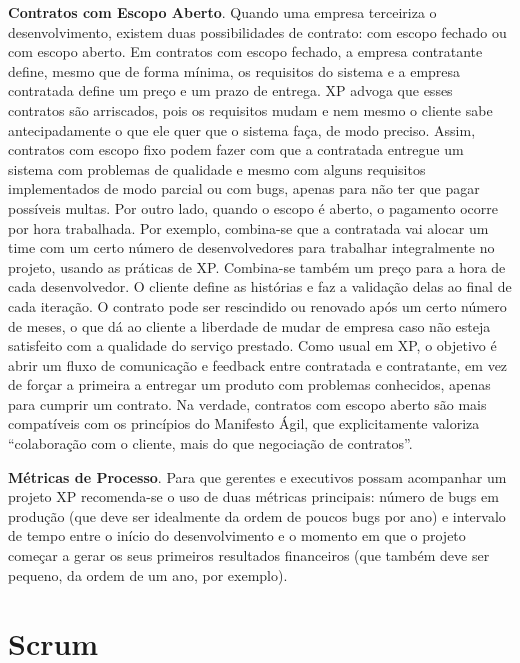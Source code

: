 \documentclass[
  11pt,
  twoside]{book}
\begin{document}
\textbf{Contratos com Escopo Aberto}. Quando uma empresa terceiriza o
desenvolvimento, existem duas possibilidades de contrato: com escopo
fechado ou com escopo aberto. Em contratos com escopo fechado, a empresa
contratante define, mesmo que de forma mínima, os requisitos do sistema
e a empresa contratada define um preço e um prazo de entrega. XP advoga
que esses contratos são arriscados, pois os requisitos mudam e nem mesmo
o cliente sabe antecipadamente o que ele quer que o sistema faça, de
modo preciso. Assim, contratos com escopo fixo podem fazer com que a
contratada entregue um sistema com problemas de qualidade e mesmo com
alguns requisitos implementados de modo parcial ou com bugs, apenas para
não ter que pagar possíveis multas. Por outro lado, quando o escopo é
aberto, o pagamento ocorre por hora trabalhada. Por exemplo, combina-se
que a contratada vai alocar um time com um certo número de
desenvolvedores para trabalhar integralmente no projeto, usando as
práticas de XP. Combina-se também um preço para a hora de cada
desenvolvedor. O cliente define as histórias e faz a validação delas ao
final de cada iteração. O contrato pode ser rescindido ou renovado após
um certo número de meses, o que dá ao cliente a liberdade de mudar de
empresa caso não esteja satisfeito com a qualidade do serviço prestado.
Como usual em XP, o objetivo é abrir um fluxo de comunicação e feedback
entre contratada e contratante, em vez de forçar a primeira a entregar
um produto com problemas conhecidos, apenas para cumprir um contrato. Na
verdade, contratos com escopo aberto são mais compatíveis com os
princípios do Manifesto Ágil, que explicitamente valoriza ``colaboração
com o cliente, mais do que negociação de contratos''.

 \textbf{Métricas de
Processo}. Para que gerentes e executivos possam acompanhar um projeto
XP recomenda-se o uso de duas métricas principais: número de bugs em
produção (que deve ser idealmente da ordem de poucos bugs por ano) e
intervalo de tempo entre o início do desenvolvimento e o momento em que
o projeto começar a gerar os seus primeiros resultados financeiros (que
também deve ser pequeno, da ordem de um ano, por exemplo).

\hypertarget{scrum}{%
\section{Scrum}\label{scrum}}
\end{document}
